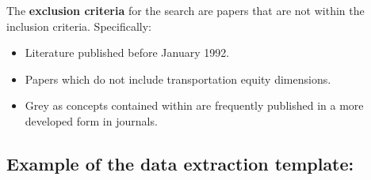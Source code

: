 \documentclass[12pt, oneside]{report}
\providecommand{\tightlist}{%
  \setlength{\itemsep}{0pt}\setlength{\parskip}{0pt}}\usepackage{longtable,booktabs,array}
\begin{document}
The \textbf{exclusion criteria} for the search are papers that are not
within the inclusion criteria. Specifically:

\begin{itemize}
\tightlist
\item
  Literature published before January 1992.
\item
  Papers which do not include transportation equity dimensions.
\item
  Grey as concepts contained within are frequently published in a more
  developed form in journals.
\end{itemize}

\hypertarget{example-of-the-data-extraction-template}{%
\subsection{Example of the data extraction
template:}\label{example-of-the-data-extraction-template}}
\end{document}
